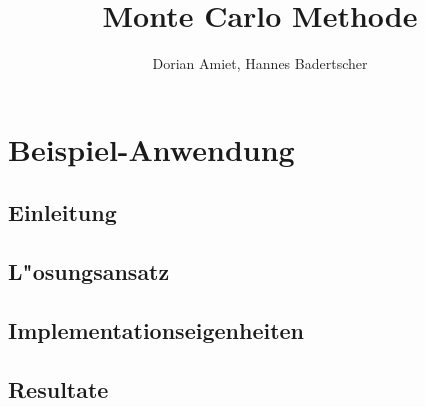 \documentclass{book}
\begin{document}
\title{Monte Carlo Methode}
\author{Dorian Amiet, Hannes Badertscher}
\date{}
\maketitle



\chapter{Beispiel-Anwendung}
\begin{refsection}

\section{Einleitung}
\section{L"osungsansatz}
\section{Implementationseigenheiten}
\section{Resultate}

\printbibliography[heading=subbibliography]
\end{refsection}
\end{document}
